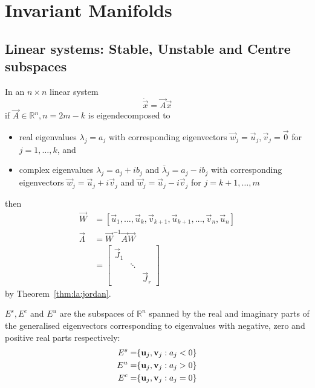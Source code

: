 \section{Invariant Manifolds}
\subsection{Linear systems: Stable, Unstable and Centre subspaces}
In an $n \times n$ linear system
\begin{equation*}
	\dot{\vec x} = \vec A \vec x
\end{equation*}
if $\vec A \in \mathbb R^n, n = 2m - k$ is eigendecomposed to
\begin{itemize}
 	\item real eigenvalues $\lambda_j = a_j$ with corresponding eigenvectors $\vec w_j = \vec u_j, \vec v_j = \vec 0$ for $j = 1, \dotsc, k$, and
 	\item complex eigenvalues $\lambda_j = a_j + ib_j$ and $\bar \lambda_j = a_j - ib_j$ with corresponding eigenvectors $\vec w_j = \vec u_j + i\vec v_j$ and $\vec w_j = \vec u_j - i\vec v_j$ for $j = k + 1, \dotsc, m$
\end{itemize}
then
\begin{align*}
	\vec W 			&= [\vec u_1, \dotsc, \vec u_k, \vec v_{k + 1}, \vec u_{k + 1}, \dotsc, \vec v_n, \vec u_n] \\
	\vec \Lambda 	&= \vec W^{-1} \vec A \vec W \\
					&=
						\begin{bmatrix}
							\vec J_1 	& 			& \\
										& \ddots 	& \\
										&			& \vec J_r
						\end{bmatrix}
\end{align*}
by Theorem~\ref{thm:la:jordan}.

\begin{definition}
	$E^s, E^c$ and $E^u$ are the subspaces of $\mathbb R^n$ spanned by the real and imaginary parts of the generalised eigenvectors corresponding to eigenvalues with negative, zero and positive real parts respectively:
	\begin{align*}
		E^s &= \span\{\vec u_j, \vec v_j: a_j < 0\} \\
		E^u &= \span\{\vec u_j, \vec v_j: a_j > 0\} \\
		E^c &= \span\{\vec u_j, \vec v_j: a_j = 0\}
	\end{align*}
\end{definition}

